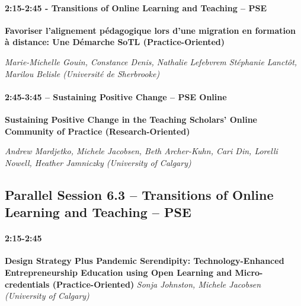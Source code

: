 \documentclass[
]{book}
\begin{document}
\begin{secondary}
\hypertarget{transitions-of-online-learning-and-teaching-pse}{%
\paragraph{2:15-2:45 - Transitions of Online Learning and Teaching --
PSE}\label{transitions-of-online-learning-and-teaching-pse}}

\textbf{Favoriser l'alignement pédagogique lors d'une migration en
formation à distance: Une Démarche SoTL (Practice-Oriented)}

\emph{Marie-Michelle Gouin, Constance Denis, Nathalie Lefebvrem
Stéphanie Lanctôt, Marilou Belisle (Université de Sherbrooke)}
\end{secondary}

\begin{secondary}
\hypertarget{sustaining-positive-change-pse-online}{%
\paragraph{2:45-3:45 -- Sustaining Positive Change -- PSE
Online}\label{sustaining-positive-change-pse-online}}

\textbf{Sustaining Positive Change in the Teaching Scholars' Online
Community of Practice (Research-Oriented)}

\emph{Andrew Mardjetko, Michele Jacobsen, Beth Archer-Kuhn, Cari Din,
Lorelli Nowell, Heather Jamniczky (University of Calgary)}
\end{secondary}

\hypertarget{parallel-session-6.3-transitions-of-online-learning-and-teaching-pse}{%
\subsection*{Parallel Session 6.3 -- Transitions of Online Learning and Teaching -- PSE}\label{parallel-session-6.3-transitions-of-online-learning-and-teaching-pse}}

\begin{secondary}
\hypertarget{section}{%
\paragraph{2:15-2:45}\label{section}}

\textbf{Design Strategy Plus Pandemic Serendipity: Technology-Enhanced
Entrepreneurship Education using Open Learning and Micro-credentials
(Practice-Oriented)} \emph{Sonja Johnston, Michele Jacobsen (University
of Calgary)}
\end{secondary}
\end{document}
